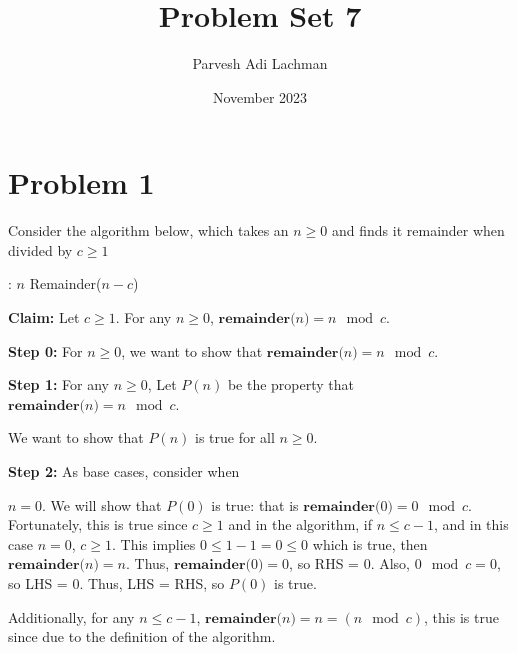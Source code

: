 \documentclass{article}
\title{Problem Set 7}
\author{Parvesh Adi Lachman}
\date{November 2023}
\begin{document}
\maketitle
\section{Problem 1}

Consider the algorithm below, which takes an $n\geq 0$ and finds it remainder when divided by $c\geq 1$

\vspace{15pt}

\begin{algorithmic}
:
\State \Return $n$
\Else
\State \Return Remainder($n-c$)
\EndIf
\EndFunction
\end{algorithmic}

\vspace{10pt}


\noindent\textbf{Claim:} Let $c\geq 1$. For any $n\geq 0$, $\textbf{remainder($n$)}=n\mod c$.
\vspace{10pt}


\textbf{Step 0:} For $n\geq 0$, we want to show that $\textbf{remainder($n$)}=n\mod c$. 
\vspace{15pt}

\textbf{Step 1:} For any $n\geq 0$, Let $P(n)$ be the property that $\textbf{remainder($n$)}=n\mod c$.

\vspace{5pt}
We want to show that $P(n)$ is true for all $n\geq 0$.


\vspace{15pt}

\textbf{Step 2:} As base cases, consider when\vspace{10pt}


$n=0$. We will show that $P(0)$ is true: that is $\textbf{remainder($0$)}=0\mod c$. Fortunately, this is true since $c\geq 1$ and in the algorithm, if $n\leq c-1$, and in this case $n=0$, $c\geq1$. This implies $0\leq 1-1=0\leq0$ which is true, then $\textbf{remainder($n$)}=n$. Thus, $\textbf{remainder($0$)}=0$, so RHS = 0. Also, $0\mod c=0$, so LHS = 0. Thus, LHS = RHS, so $P(0)$ is true.
\vspace{10pt}

Additionally, for any $n\leq c-1$, $\textbf{remainder($n$)}=n=(n\mod c)$, this is true since due to the definition of the algorithm. 
\end{document}
